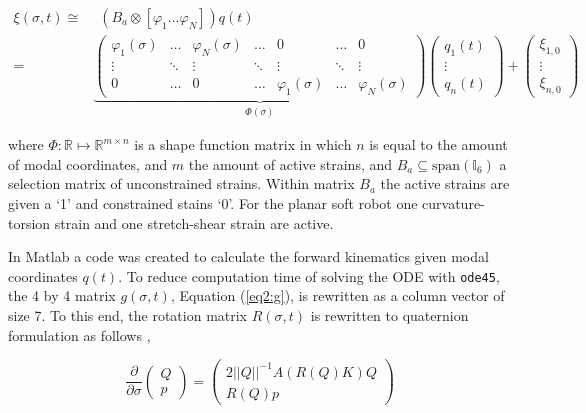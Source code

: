 \begin{equation}
\begin{aligned}
    \xi(\sigma,t) \cong & \hspace{5pt}  (B_a \otimes [ \varphi_1 \dots \varphi_N ])q(t)\\ = &  \underbrace{ \begin{pmatrix}
    \varphi_1(\sigma) & \dots  & \varphi_N(\sigma) & \dots     & 0      & \dots  &  0 \\
    \vdots    & \ddots & \vdots    & \ddots    & \vdots & \ddots & \vdots \\
    0         & \dots  & 0         & \dots     & \varphi_1(\sigma) & \dots & \varphi_N (\sigma)
    \end{pmatrix}}_{\Phi(\sigma)} \begin{pmatrix} q_1(t) \\ \vdots \\ q_n(t) \end{pmatrix} +  \begin{pmatrix} \xi_{1,0} \\ \vdots \\ \xi_{n,0}   \end{pmatrix}
    \end{aligned}
\label{eq2:xishape}
\end{equation}

where $\Phi : \mathbb{R} \mapsto \mathbb{R}^{m \times n}$ is a shape function matrix in which $n$ is equal to the amount of modal coordinates, and $m$ the amount of active strains, and $B_a \subseteq \text{span}(\mathbb{I}_6)$ a selection matrix of unconstrained strains. Within matrix $B_a$ the active strains are given a `1' and constrained stains `0'. For the planar soft robot one curvature-torsion strain and one stretch-shear strain are active. 


In Matlab \cite{MATLAB2020} a code was created to calculate the forward kinematics given modal coordinates $q(t)$. To reduce computation time of solving the ODE with \verb+ode45+, the 4 by 4 matrix $g(\sigma,t)$, Equation (\ref{eq2:g}), is rewritten as a column vector of size 7. To this end, the rotation matrix $R(\sigma,t)$ is rewritten to quaternion formulation as follows \cite{Boyer2019},


\begin{equation}
\frac{\partial}{\partial \sigma}    \begin{pmatrix} Q \\ p \end{pmatrix} = \begin{pmatrix} 2 ||Q||^{-1} A(R(Q)K)Q \\ R(Q)p \end{pmatrix}
\label{eq2:Qp}
\end{equation}

